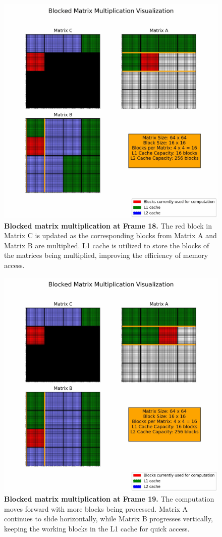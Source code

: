 \begin{figure}[htbp]
  \centering
  \includegraphics[width=0.8\linewidth]{images/bmmco_animation_18.jpg}
  \caption{\textbf{Blocked matrix multiplication at Frame 18.} The red block in Matrix C is updated as the corresponding blocks from Matrix A and Matrix B are multiplied. L1 cache is utilized to store the blocks of the matrices being multiplied, improving the efficiency of memory access.}
  \label{fig:frame18}
\end{figure}

\begin{figure}[htbp]
  \centering
  \includegraphics[width=0.8\linewidth]{images/bmmco_animation_19.jpg}
  \caption{\textbf{Blocked matrix multiplication at Frame 19.} The computation moves forward with more blocks being processed. Matrix A continues to slide horizontally, while Matrix B progresses vertically, keeping the working blocks in the L1 cache for quick access.}
  \label{fig:frame19}
\end{figure}

